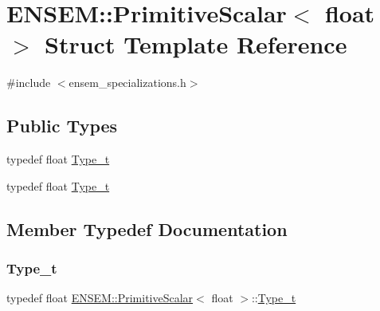 \hypertarget{structENSEM_1_1PrimitiveScalar_3_01float_01_4}{}\section{E\+N\+S\+EM\+:\+:Primitive\+Scalar$<$ float $>$ Struct Template Reference}
\label{structENSEM_1_1PrimitiveScalar_3_01float_01_4}


{\ttfamily \#include $<$ensem\+\_\+specializations.\+h$>$}

\subsection*{Public Types}
\begin{DoxyCompactItemize}
\item 
typedef float \mbox{\hyperlink{structENSEM_1_1PrimitiveScalar_3_01float_01_4_a227fd22d14a3854ff0e0afbf40a04433}{Type\+\_\+t}}
\item 
typedef float \mbox{\hyperlink{structENSEM_1_1PrimitiveScalar_3_01float_01_4_a227fd22d14a3854ff0e0afbf40a04433}{Type\+\_\+t}}
\end{DoxyCompactItemize}


\subsection{Member Typedef Documentation}
\mbox{\label{structENSEM_1_1PrimitiveScalar_3_01float_01_4_a227fd22d14a3854ff0e0afbf40a04433}} 
\subsubsection{\texorpdfstring{Type\_t}{Type\_t}\hspace{0.1cm}{\footnotesize\ttfamily [1/2]}}
{\footnotesize\ttfamily typedef float \mbox{\hyperlink{structENSEM_1_1PrimitiveScalar}{E\+N\+S\+E\+M\+::\+Primitive\+Scalar}}$<$ float $>$\+::\mbox{\hyperlink{structENSEM_1_1PrimitiveScalar_3_01float_01_4_a227fd22d14a3854ff0e0afbf40a04433}{Type\+\_\+t}}}

\mbox{\label{structENSEM_1_1PrimitiveScalar_3_01float_01_4_a227fd22d14a3854ff0e0afbf40a04433}} 
